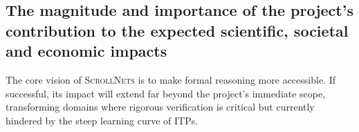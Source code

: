 \documentclass[11pt]{msca-pf}
\newcommand{\proj}{\small\textsc{ScrollNets}}
\begin{document}



\subsection{The magnitude and importance of the project’s contribution to the
    expected scientific, societal and economic impacts}
\label{ssc:impact:future}

The core vision of {\proj} is to make formal reasoning more accessible. If successful, its impact
will extend far beyond the project's immediate scope, transforming domains where rigorous
verification is critical but currently hindered by the steep learning curve of ITPs.
\end{document}
